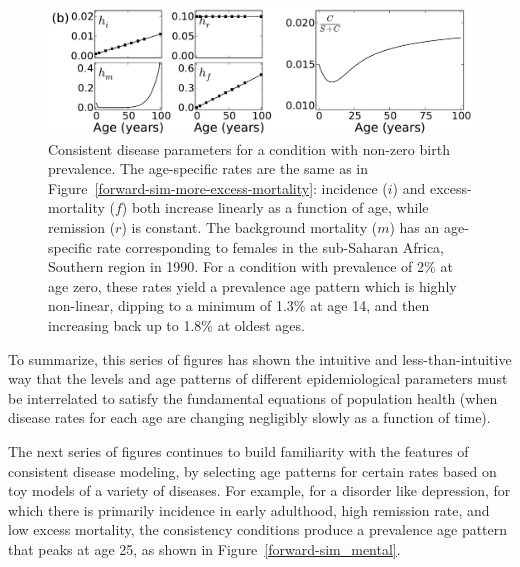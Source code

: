 \begin{figure}[h]
\begin{center}

\includegraphics[width=\textwidth]{birth-prevalence.pdf}

\caption{Consistent disease parameters for a condition with non-zero
  birth prevalence.  The age-specific rates are the same as in
  Figure~\ref{forward-sim-more-excess-mortality}: incidence ($i$) and
  excess-mortality ($f$) both increase linearly as a function of age,
  while remission ($r$) is constant. The background mortality ($m$)
  has an age-specific rate corresponding to females in the sub-Saharan
  Africa, Southern region in 1990. For a condition with prevalence of
  2\% at age zero, these rates yield a prevalence age pattern which is
  highly non-linear, dipping to a minimum of 1.3\% at age 14, and then
  increasing back up to 1.8\% at oldest ages.}
\label{forward-sim-birth-prevalence}
\end{center}
\end{figure}


To summarize, this series of figures has shown the intuitive and
less-than-intuitive way that the levels and age patterns of different
epidemiological parameters must be interrelated to satisfy the
fundamental equations of population health (when disease rates for
each age are changing negligibly slowly as a function of time).

The next series of figures continues to build familiarity with the
features of consistent disease modeling, by selecting age patterns for
certain rates based on toy models of a variety of diseases.  For
example, for a disorder like depression, for which there is primarily
incidence in early adulthood, high remission rate, and low excess
mortality, the consistency conditions produce a prevalence age pattern
that peaks at age 25, as shown in Figure~\ref{forward-sim_mental}.

